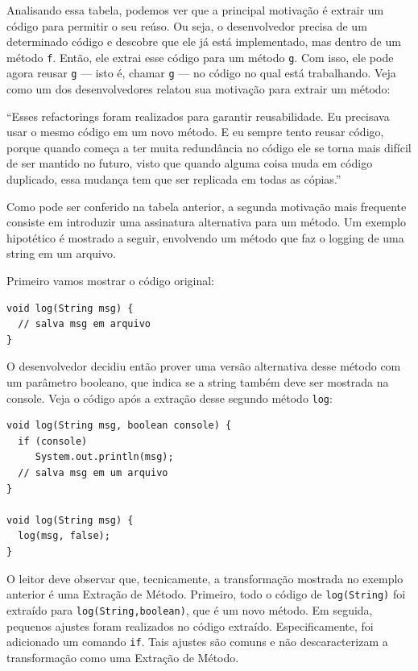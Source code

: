 \documentclass[
  11pt,
  twoside]{book}
\newcommand{\passthrough}[1]{#1}
\renewenvironment{quote}{\centering \vspace{1.5ex} \begin{tcolorbox}[colback=backcolor, width=4.9in]}{\end{tcolorbox}}
\begin{document}
Analisando essa tabela, podemos ver que a principal motivação é extrair
um código para permitir o seu reúso. Ou seja, o desenvolvedor precisa de
um determinado código e descobre que ele já está implementado, mas
dentro de um método \passthrough{\lstinline!f!}. Então, ele extrai esse
código para um método \passthrough{\lstinline!g!}. Com isso, ele pode
agora reusar \passthrough{\lstinline!g!} --- isto é, chamar
\passthrough{\lstinline!g!} --- no código no qual está trabalhando. Veja
como um dos desenvolvedores relatou sua motivação para extrair um
método:

\begin{quote}
``Esses refactorings foram realizados para garantir reusabilidade. Eu
precisava usar o mesmo código em um novo método. E eu sempre tento
reusar código, porque quando começa a ter muita redundância no código
ele se torna mais difícil de ser mantido no futuro, visto que quando
alguma coisa muda em código duplicado, essa mudança tem que ser
replicada em todas as cópias.''
\end{quote}

Como pode ser conferido na tabela anterior, a segunda motivação mais
frequente consiste em introduzir uma assinatura alternativa para um
método. Um exemplo hipotético é mostrado a seguir, envolvendo um método
que faz o logging de uma string em um arquivo.

Primeiro vamos mostrar o código original:

\begin{lstlisting}
void log(String msg) {
  // salva msg em arquivo
}
\end{lstlisting}

O desenvolvedor decidiu então prover uma versão alternativa desse método
com um parâmetro booleano, que indica se a string também deve ser
mostrada na console. Veja o código após a extração desse segundo método
\passthrough{\lstinline!log!}:

\begin{lstlisting}
void log(String msg, boolean console) {
  if (console)
     System.out.println(msg);
  // salva msg em um arquivo
}

void log(String msg) {
  log(msg, false);
}
\end{lstlisting}

O leitor deve observar que, tecnicamente, a transformação mostrada no
exemplo anterior é uma Extração de Método. Primeiro, todo o código de
\passthrough{\lstinline!log(String)!} foi extraído para
\passthrough{\lstinline!log(String,boolean)!}, que é um novo método. Em
seguida, pequenos ajustes foram realizados no código extraído.
Especificamente, foi adicionado um comando \passthrough{\lstinline!if!}.
Tais ajustes são comuns e não descaracterizam a transformação como uma
Extração de Método.
\end{document}
